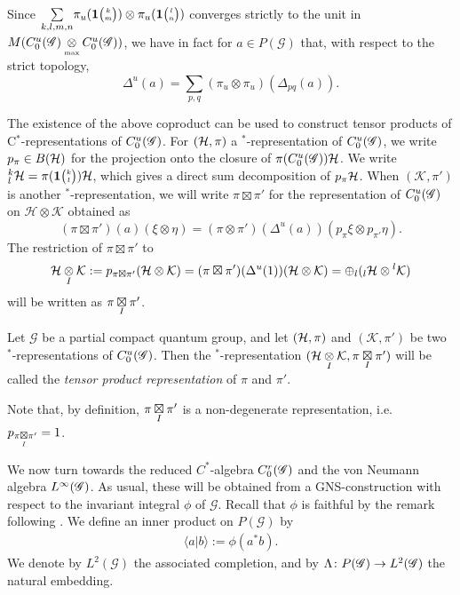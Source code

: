 Since $\underset{k,l,m,n}{\sum} \pi_u(\mathbf{1}{\tiny {\begin{pmatrix} k\\m\end{pmatrix}}})\otimes \pi_u(\mathbf{1}{\tiny {\begin{pmatrix} l\\n\end{pmatrix}}})$ converges strictly to the unit in $M(C_0^u(\mathscr{G})\underset{{\scriptscriptstyle \mathrm{ max}}}{\otimes} C_0^u(\mathscr{G}))$, we have in fact for $a\in P(\mathscr{G})$ that, with respect to the strict topology, \[\Delta^u(a) = \sum_{p,q} (\pi_{u} \otimes \pi_{u})(\Delta_{pq}(a)).\]

The existence of the above coproduct can be used to construct tensor products of C$^*$-representations of $C^{u}_{0}(\mathscr{G})$. For $(\mathcal{H},\pi)$ a $^*$-representation of $C^{u}_{0}(\mathscr{G})$, we write $p_{\pi}\in B(\mathcal{H})$ for the projection onto the closure of $\pi(C^{u}_{0}(\mathscr{G}))\mathcal{H}$. We write ${}^{k}_{l}\mathcal{H} = \pi(\mathbf{1}{\tiny {\begin{pmatrix} k\\l\end{pmatrix}}})\mathcal{H}$, which gives a direct sum decomposition of $p_{\pi}\mathcal{H}$.  When $(\mathcal{K},\pi')$ is another $^*$-representation, we will write $\pi \boxtimes \pi'$ for the representation of $C^{u}_{0}(\mathscr{G})$ on $\mathcal{H}\otimes \mathcal{K}$ obtained as \[(\pi \boxtimes \pi')(a)(\xi\otimes \eta) = (\pi\otimes \pi')(\Delta^u(a))(p_{\pi}\xi\otimes p_{\pi'}\eta).\] The restriction of $\pi\boxtimes \pi'$ to \[\mathcal{H}\underset{I}{\otimes} \mathcal{K} := p_{\pi \boxtimes \pi'}(\mathcal{H}\otimes \mathcal{K}) = (\pi \boxtimes \pi')(\Delta^u(1))(\mathcal{H}\otimes \mathcal{K})= \oplus_l ({}_l\mathcal{H}\otimes {}^l\mathcal{K})\] will be written as $\pi\underset{I}{\boxtimes} \pi'$. 

\begin{Def}\label{DefTenProd}  Let $\mathscr{G}$ be a partial compact quantum group, and let $(\mathcal{H},\pi)$ and $(\mathcal{K},\pi')$ be two $^*$-representations of $C^{u}_{0}(\mathscr{G})$. Then the $^*$-representation $(\mathcal{H}\underset{I}{\otimes} \mathcal{K},\pi\underset{I}{\boxtimes} \pi')$ will be called the \emph{tensor product representation} of $\pi$ and $\pi'$. 
\end{Def} 

Note that, by definition, $\pi\underset{I}{\boxtimes} \pi'$ is a non-degenerate representation, i.e.~ $p_{\pi\underset{I}{\boxtimes} \pi'} = 1$.



We now turn towards the reduced $C^{*}$-algebra $C^{r}_{0}(\mathscr{G})$ and the von Neumann algebra
$L^{\infty}(\mathscr{G})$. As usual, these will be obtained from a GNS-construction with respect to the invariant
integral $\phi$ of $\mathscr{G}$. Recall that $\phi$ is faithful by the remark following \cite[Corollary 2.16]{DCT1}.  We define an inner product on $P(\mathscr{G})$ by
\begin{align*}
  \langle a|b\rangle :=\phi(a^{*}b).
\end{align*}
We denote by $L^{2}(\mathscr{G})$ the associated completion, and by
$\Lambda \colon P(\mathscr{G}) \to L^{2}(\mathscr{G})$ the natural embedding.

